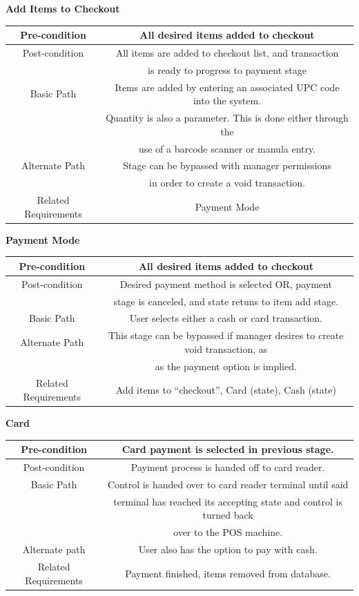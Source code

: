 \begin{center}
\textbf{Add Items to Checkout}
\begin{tabular}{|c|c|}\hline
Pre-condition & All desired items added to checkout \\ \hline
Post-condition & All items are added to checkout list, and transaction\\
& is ready to progress to payment stage \\ \hline
Basic Path & Items are added by entering an associated UPC code into the system.\\
& Quantity is also a parameter. This is done either through the\\
&  use of a barcode scanner or manula entry. \\ \hline
Alternate Path & Stage can be bypassed with manager permissions\\
& in order to create a void transaction.\\ \hline
Related Requirements & Payment Mode \\ \hline
\end{tabular}\vspace{2em}

\textbf{Payment Mode}
\begin{tabular}{|c|c|}\hline
Pre-condition & All desired items added to checkout \\ \hline
Post-condition & Desired payment method is selected OR, payment\\
& stage is canceled, and state retuns to item add stage.\\ \hline
Basic Path & User selects either a cash or card transaction. \\ \hline
Alternate Path & This stage can be bypassed if manager desires to create void transaction, as\\
& as the payment option is implied. \\ \hline
Related Requirements & Add items to ``checkout'', Card (state), Cash (state) \\ \hline
\end{tabular}\vspace{2em}

\textbf{Card}
\begin{tabular}{|c|c|}\hline
Pre-condition & Card payment is selected in previous stage.\\ \hline
Post-condition & Payment process is handed off to card reader. \\ \hline
Basic Path & Control is handed over to card reader terminal until said\\
& terminal has reached its accepting state and control is turned back\\
& over to the POS machine. \\ \hline
Alternate path & User also has the option to pay with cash. \\ \hline
Related Requirements & Payment finished, items removed from database. \\ \hline
\end{tabular}\vspace{2em}


\end{center}
